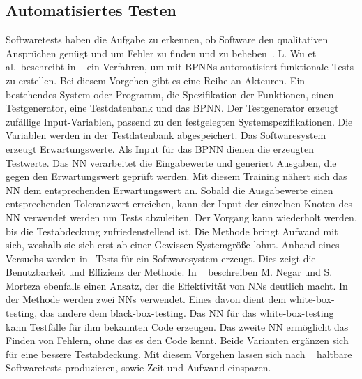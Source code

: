 \subsection{Automatisiertes Testen}
Softwaretests haben die Aufgabe zu erkennen, ob Software den qualitativen Ansprüchen genügt und um Fehler zu finden und zu beheben~\cite{Wu2008}.
L. Wu et al.~beschreibt in ~\cite{Wu2008} ein Verfahren, um mit BPNNs automatisiert funktionale Tests zu erstellen. 
Bei diesem Vorgehen gibt es eine Reihe an Akteuren. Ein bestehendes System oder Programm, die Spezifikation der Funktionen, einen Testgenerator, eine Testdatenbank und das BPNN. Der Testgenerator erzeugt zufällige Input-Variablen, passend zu den festgelegten Systemspezifikationen. Die Variablen werden in der Testdatenbank abgespeichert. Das Softwaresystem erzeugt Erwartungswerte. Als Input für das BPNN dienen die erzeugten Testwerte. Das NN verarbeitet die Eingabewerte und generiert Ausgaben, die gegen den Erwartungswert geprüft werden.
Mit diesem Trai\-ning nähert sich das NN dem entsprechenden Erwartungswert an.
Sobald die Ausgabewerte einen entsprechenden Toleranzwert erreichen, kann der Input der einzelnen Knoten des NN verwendet werden um Tests abzuleiten. Der Vorgang kann wiederholt werden, bis die Testabdeckung zufriedenstellend ist. Die Methode bringt Aufwand mit sich, weshalb sie sich erst ab einer Gewissen Systemgröße lohnt. Anhand eines Versuchs werden in~\cite{Wu2008} Tests für ein Softwaresystem erzeugt. Dies zeigt die Benutzbarkeit und Effizienz der Methode.
\noindent In ~\cite{Majma2014} beschreiben M. Negar und S. Morteza ebenfalls einen Ansatz, der die Effektivität von NNs deutlich macht. In der Methode werden zwei NNs verwendet. Eines davon dient dem white-box-testing, das andere dem black-box-testing. Das NN für das white-box-testing kann Testfälle für ihm bekannten Code erzeugen. Das zweite NN ermöglicht das Finden von Fehlern, ohne das es den Code kennt. Beide Varianten ergänzen sich für eine bessere Testabdeckung. Mit diesem Vorgehen lassen sich nach ~\cite{Majma2014} haltbare Softwaretests produzieren, sowie Zeit und Aufwand einsparen.

